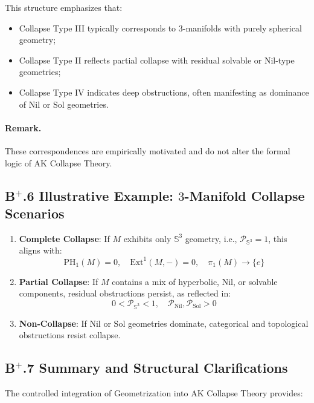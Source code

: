 \documentclass[11pt]{article}
\begin{document}
This structure emphasizes that:

\begin{itemize}
    \item Collapse Type III typically corresponds to $3$-manifolds with purely spherical geometry;
    \item Collapse Type II reflects partial collapse with residual solvable or Nil-type geometries;
    \item Collapse Type IV indicates deep obstructions, often manifesting as dominance of $\mathrm{Nil}$ or $\mathrm{Sol}$ geometries.
\end{itemize}

\paragraph{Remark.} These correspondences are empirically motivated and do not alter the formal logic of AK Collapse Theory.

\subsection*{B$^{+}$.6 Illustrative Example: $3$-Manifold Collapse Scenarios}

\begin{enumerate}
    \item \textbf{Complete Collapse}: If $M$ exhibits only $\mathbb{S}^3$ geometry, i.e., $\mathcal{P}_{\mathbb{S}^3} = 1$, this aligns with:
    \[
    \mathrm{PH}_1(M) = 0,\quad \mathrm{Ext}^1(M, -) = 0,\quad \pi_1(M) \longrightarrow \{e\}
    \]
    \item \textbf{Partial Collapse}: If $M$ contains a mix of hyperbolic, Nil, or solvable components, residual obstructions persist, as reflected in:
    \[
    0 < \mathcal{P}_{\mathbb{S}^3} < 1,\quad \mathcal{P}_{\mathrm{Nil}},\mathcal{P}_{\mathrm{Sol}} > 0
    \]
    \item \textbf{Non-Collapse}: If $\mathrm{Nil}$ or $\mathrm{Sol}$ geometries dominate, categorical and topological obstructions resist collapse.
\end{enumerate}

\subsection*{B$^{+}$.7 Summary and Structural Clarifications}

The controlled integration of Geometrization into AK Collapse Theory provides:
\end{document}
